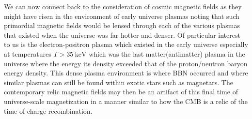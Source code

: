 \documentclass[Universe,article,submit,moreauthors,pdftex]{Definitions/mdpi}
\begin{document}
We can now connect back to the consideration of cosmic magnetic fields as they might have risen in the environment of early universe plasmas noting that such primordial magnetic fields would be lensed through each of the various plasmas that existed when the universe was far hotter and denser. Of particular interest to us is the electron-positron plasma which existed in the early universe especially at temperatures $T>35\ \mathrm{keV}$ which was the last matter(antimatter) plasma in the universe where the energy its density exceeded that of the proton/neutron baryon energy density. This dense plasma environment is where BBN occurred and where similar plasmas can still be found within exotic stars such as magnetars. The contemporary relic magnetic fields may then be an artifact of this final time of universe-scale magnetization in a manner similar to how the CMB is a relic of the time of charge recombination.

\end{document}
